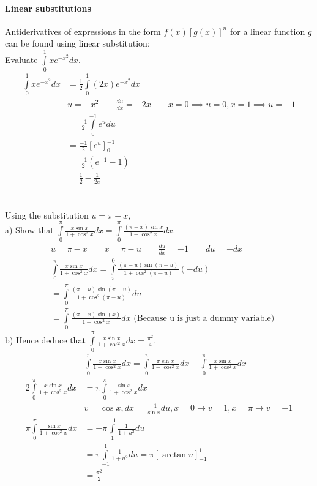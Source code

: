 \documentclass[a4paper,twoside]{article}
\newenvironment{examquestion}[1]{%
	\mbox{}\\\tcolorbox[beamer,breakable,%
	title=Exam-style Question: #1,standard jigsaw,opacityback=0, colframe=red!75!black]}{\endtcolorbox\mbox{}\\}
\begin{document}
			\paragraph{Linear substitutions} Antiderivatives of expressions in the form $f(x)[g(x)]^n$ for a linear function $g$ can be found using linear substitution:
			\begin{examquestion}{}
				Evaluate $\int\limits_0^1xe^{-x^2}dx$.\\
				\begin{align*}
					\int\limits_0^1xe^{-x^2}dx&=\frac{1}{2}\int\limits_0^1(2x)e^{-x^2}dx \\
					&u=-x^2 \qquad \frac{du}{dx}=-2x \qquad x=0\implies u=0, x=1\implies u=-1 \\
					&=\frac{-1}{2}\int\limits_0^{-1}e^udu\\
					&=\frac{-1}{2}\left[e^u\right]_0^{-1} \\
					&=\frac{-1}{2}\left(e^{-1}-1\right)\\
					&=\frac{1}{2}-\frac{1}{2e}
				\end{align*}
			\end{examquestion}
			\begin{examquestion}{}
				Using the substitution $u=\pi-x$,\\
				a) Show that $\displaystyle\int\limits_0^\pi\frac{x\sin x}{1+\cos^2x}dx=\int\limits_0^\pi\frac{(\pi-x)\sin x}{1+\cos^2x}dx$.\\
				\begin{align*}
					&u=\pi-x \qquad x=\pi-u \qquad \frac{du}{dx}=-1 \qquad du=-dx \\
					&\int\limits_{0}^{\pi}\frac{x\sin x}{1+\cos^2x}dx=\int\limits_{\pi}^{0}\frac{(\pi-u)\sin(\pi-u)}{1+\cos^2(\pi-u)}(-du)\\
					&=\int\limits_0^\pi\frac{(\pi-u)\sin(\pi-u)}{1+\cos^2(\pi-u)}du \\
					&=\int\limits_0^\pi\frac{(\pi-x)\sin(x)}{1+\cos^2x}dx \text{ (Because u is just a dummy variable)}
				\end{align*}
				b) Hence deduce that $\displaystyle\int\limits_0^\pi\frac{x\sin x}{1+\cos^2x}dx=\frac{\pi^2}{4}$.
				\begin{align*}
					&\int\limits_{0}^{\pi}\frac{x\sin x}{1+\cos^2x}dx=\int\limits_{0}^{\pi}\frac{\pi\sin x}{1+\cos^2x}dx-\int\limits_{0}^{\pi}\frac{x\sin x}{1+\cos^2x}dx \\
					2\int\limits_{0}^{\pi}\frac{x\sin x}{1+\cos^2x}dx&=\pi\int\limits_0^\pi\frac{\sin x}{1+\cos^2 x}dx\\
					&v=\cos x, dx=\frac{-1}{\sin x}du, x=0\to v=1, x=\pi\to v=-1 \\
					\pi\int\limits_0^\pi\frac{\sin x}{1+\cos^2 x}dx&=-\pi\int\limits_1^{-1}\frac{1}{1+u^2}du\\
					&=\pi\int\limits_{-1}^1\frac{1}{1+u^2}du=\pi\left[\arctan u\right]_{-1}^1 \\
					&=\frac{\pi^2}{2}
				\end{align*}
			\end{examquestion}
\end{document}
